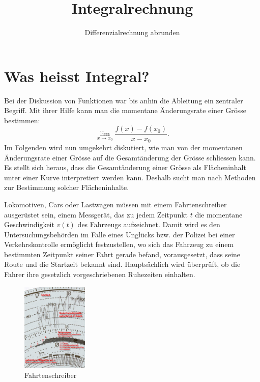 \documentclass[%
11pt,%
twoside,%
titlepage,%
german,%
headsepline%
]{scrartcl}
\title{Integralrechnung}
\subtitle{Differenzialrechnung abrunden}
\author{}
\date{}
\begin{document}
\maketitle
\tableofcontents
\cleardoublepage

\section{Was heisst Integral?}

Bei der Diskussion von Funktionen war bis anhin die Ableitung ein zentraler Begriff. Mit ihrer Hilfe kann man die momentane Änderungsrate einer Grösse bestimmen:
$$\lim_{x\rightarrow x_0}\frac{f(x)-f(x_0)}{x-x_0}.$$
Im Folgenden wird nun umgekehrt diskutiert, wie man von der momentanen Änderungsrate einer Grösse auf die Gesamtänderung der Grösse schliessen kann. Es stellt sich heraus, dass die Gesamtänderung einer Grösse als Flächeninhalt unter einer Kurve interpretiert werden kann. Deshalb sucht man nach Methoden zur Bestimmung solcher Flächeninhalte.

Lokomotiven, Cars oder Lastwagen müssen mit einem Fahrtenschreiber ausgerüstet sein, einem Messgerät, das zu jedem Zeitpunkt $t$ die momentane Geschwindigkeit $v(t)$ des Fahrzeugs aufzeichnet. Damit wird es den Untersuchungsbehörden im Falle eines Unglücks bzw. der Polizei bei einer Verkehrskontrolle ermöglicht festzustellen, wo sich das Fahrzeug zu einem bestimmten Zeitpunkt seiner Fahrt gerade befand, vorausgesetzt, dass seine Route und die Startzeit bekannt sind. Hauptsächlich wird überprüft, ob die Fahrer ihre gesetzlich vorgeschriebenen Ruhezeiten einhalten.

\begin{figure}[h!t]
\begin{center}
\includegraphics[width=0.28\textwidth]{pictures/tachozoom}
\end{center}
\caption{Fahrtenschreiber}\label{abb:schreiber}
\end{figure}
\end{document}
